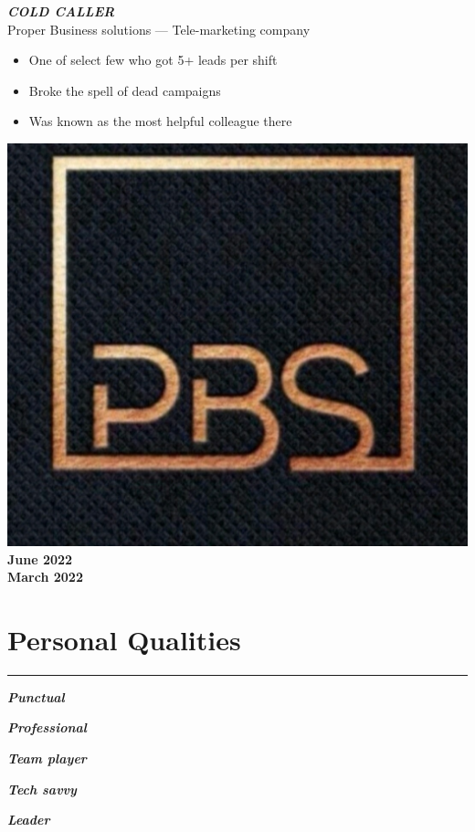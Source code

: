 \documentclass[10pt]{article}
\newcommand{\fancy}[1]{\Large\textbf{\textit{#1}}}
\begin{document}

\noindent
\vspace{2em}
\begin{minipage}{0.7\textwidth}
 \fancy{COLD CALLER} \\
{\large Proper Business solutions --- Tele-marketing company} \\
\begin{itemize}
    \item One of select few who got 5+ leads per shift
    \item Broke the spell of dead campaigns
    \item Was known as the most helpful colleague there
\end{itemize}   
\end{minipage}
\hspace{-2pt}
\begin{minipage}{0.2\textwidth}
\begin{center}
\includegraphics[width=\textwidth]{pbs_lowquality_coldcalling.jpg} \\
    \large\textbf{June 2022\\March 2022}
\end{center}
\end{minipage}

\vspace{1em}

\section*{Personal Qualities}
\hrule
\vspace{1em}
\begin{itemize*}
\item \fancy{Punctual \quad\quad}
\item \fancy{Professional \quad\quad}
\item \fancy{Team player \quad\quad}
\item \fancy{Tech savvy \quad\quad}
\item \fancy{Leader}
\end{itemize*}
\end{document}
